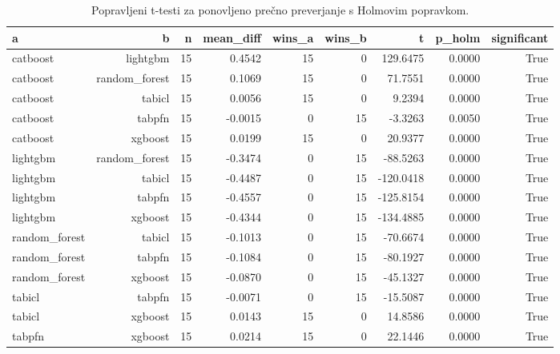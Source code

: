 \begin{table}[htbp]
\centering
\caption{Popravljeni t-testi za ponovljeno prečno preverjanje s Holmovim popravkom.}
\label{tab:corrected-ttest}
\begin{tabular}{lrrrrrrrr}
\hline
a & b & n & mean\_diff & wins\_a & wins\_b & t & p\_holm & significant \\
\hline
catboost & lightgbm & 15 & 0.4542 & 15 & 0 & 129.6475 & 0.0000 & True \\
catboost & random\_forest & 15 & 0.1069 & 15 & 0 & 71.7551 & 0.0000 & True \\
catboost & tabicl & 15 & 0.0056 & 15 & 0 & 9.2394 & 0.0000 & True \\
catboost & tabpfn & 15 & -0.0015 & 0 & 15 & -3.3263 & 0.0050 & True \\
catboost & xgboost & 15 & 0.0199 & 15 & 0 & 20.9377 & 0.0000 & True \\
lightgbm & random\_forest & 15 & -0.3474 & 0 & 15 & -88.5263 & 0.0000 & True \\
lightgbm & tabicl & 15 & -0.4487 & 0 & 15 & -120.0418 & 0.0000 & True \\
lightgbm & tabpfn & 15 & -0.4557 & 0 & 15 & -125.8154 & 0.0000 & True \\
lightgbm & xgboost & 15 & -0.4344 & 0 & 15 & -134.4885 & 0.0000 & True \\
random\_forest & tabicl & 15 & -0.1013 & 0 & 15 & -70.6674 & 0.0000 & True \\
random\_forest & tabpfn & 15 & -0.1084 & 0 & 15 & -80.1927 & 0.0000 & True \\
random\_forest & xgboost & 15 & -0.0870 & 0 & 15 & -45.1327 & 0.0000 & True \\
tabicl & tabpfn & 15 & -0.0071 & 0 & 15 & -15.5087 & 0.0000 & True \\
tabicl & xgboost & 15 & 0.0143 & 15 & 0 & 14.8586 & 0.0000 & True \\
tabpfn & xgboost & 15 & 0.0214 & 15 & 0 & 22.1446 & 0.0000 & True \\
\hline
\end{tabular}
\end{table}
